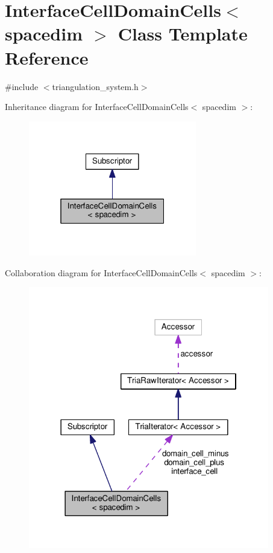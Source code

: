 \hypertarget{class_interface_cell_domain_cells}{}\section{Interface\+Cell\+Domain\+Cells$<$ spacedim $>$ Class Template Reference}
\label{class_interface_cell_domain_cells}


{\ttfamily \#include $<$triangulation\+\_\+system.\+h$>$}



Inheritance diagram for Interface\+Cell\+Domain\+Cells$<$ spacedim $>$\+:\nopagebreak
\begin{figure}[H]
\begin{center}
\leavevmode
\includegraphics[width=208pt]{class_interface_cell_domain_cells__inherit__graph}
\end{center}
\end{figure}


Collaboration diagram for Interface\+Cell\+Domain\+Cells$<$ spacedim $>$\+:\nopagebreak
\begin{figure}[H]
\begin{center}
\leavevmode
\includegraphics[width=298pt]{class_interface_cell_domain_cells__coll__graph}
\end{center}
\end{figure}
